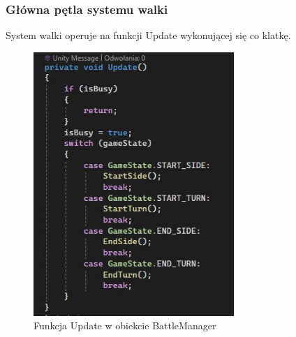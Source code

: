 \documentclass{SGGW-thesis}
\begin{document}
\subsubsection{Główna pętla systemu walki}
\label{petlagry}
System walki operuje na funkcji Update wykonującej się co klatkę.
\begin{figure}[H]
  \centering
  \includegraphics[height=10cm]{updatebattle.JPG}
  \caption{Funkcja Update w obiekcie BattleManager}
  \label{fig:UpdateBattle}
\end{figure}
\end{document}
